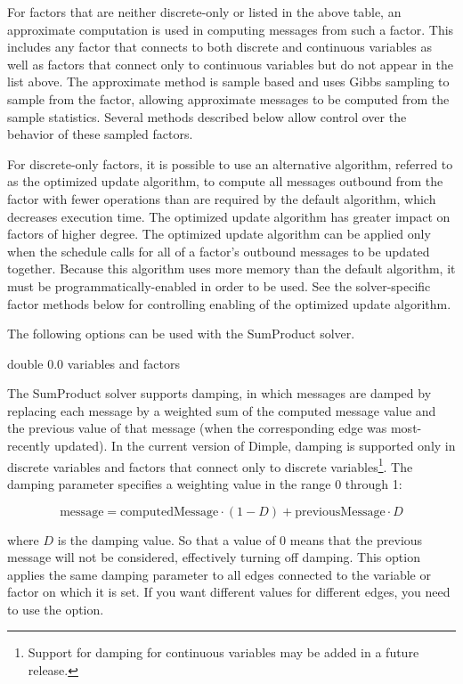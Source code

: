 For factors that are neither discrete-only or listed in the above table, an approximate computation is used in computing messages from such a factor.  This includes any factor that connects to both discrete and continuous variables as well as factors that connect only to continuous variables but do not appear in the list above.  The approximate method is sample based and uses Gibbs sampling to sample from the factor, allowing approximate messages to be computed from the sample statistics.  Several methods described below allow control over the behavior of these sampled factors.

For discrete-only factors, it is possible to use an alternative algorithm, referred to as the optimized update algorithm, to compute all messages outbound from the factor with fewer operations than are required by the default algorithm, which decreases execution time. The optimized update algorithm has greater impact on factors of higher degree. The optimized update algorithm can be applied only when the schedule calls for all of a factor's outbound messages to be updated together. Because this algorithm uses more memory than the default algorithm, it must be programmatically-enabled in order to be used. See the solver-specific factor methods below for controlling enabling of the optimized update algorithm.

\label{sec:SumProductOptions}

The following options can be used with the SumProduct solver.


{double}
{0.0}
{variables and factors}
{The SumProduct solver supports damping, in which messages are damped by replacing each message by a weighted sum of the computed message value and the previous value of that message (when the corresponding edge was most-recently updated). In the current version of Dimple, damping is supported only in discrete variables and factors that connect only to discrete variables\footnote{Support for damping for continuous variables may be added in a future release.}.
\linebreak
\linebreak
The damping parameter specifies a weighting value in the range 0 through 1:

\[
\mathrm{message} = \mathrm{computedMessage} \cdot (1 - D) + \mathrm{previousMessage} \cdot D
\]

where $D$ is the damping value. So that a value of 0 means that the previous message will not be considered, effectively turning off damping.
\linebreak
\linebreak
This option applies the same damping parameter to all edges connected to the variable or factor on which it is set. If you want different values for different edges, you need to use the  option.
}

